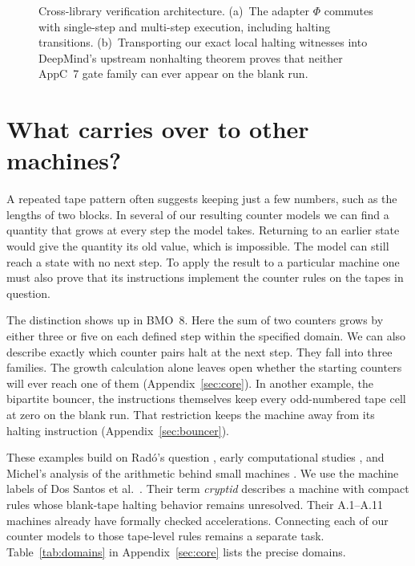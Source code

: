 \documentclass[11pt]{article}
\DeclareRobustCommand{\_}{\ifmmode\sb\else\textunderscore\allowbreak\fi}
\theoremstyle{definition}
\theoremstyle{remark}
\begin{document}
\begin{figure}[htbp]
\caption{Cross-library verification architecture. (a)~The adapter $\Phi$ commutes with single-step and multi-step execution, including halting transitions. (b)~Transporting our exact local halting witnesses into DeepMind's upstream nonhalting theorem proves that neither AppC~7 gate family can ever appear on the blank run.}
\label{fig:interop}
\end{figure}

\section{What carries over to other machines?}
\label{sec:carryover}
A repeated tape pattern often suggests keeping just a few numbers, such as the lengths of two blocks. In several of our resulting counter models we can find a quantity that grows at every step the model takes. Returning to an earlier state would give the quantity its old value, which is impossible. The model can still reach a state with no next step. To apply the result to a particular machine one must also prove that its instructions implement the counter rules on the tapes in question.

The distinction shows up in BMO~8. Here the sum of two counters grows by either three or five on each defined step within the specified domain. We can also describe exactly which counter pairs halt at the next step. They fall into three families. The growth calculation alone leaves open whether the starting counters will ever reach one of them (Appendix~\ref{sec:core}). In another example, the bipartite bouncer, the instructions themselves keep every odd-numbered tape cell at zero on the blank run. That restriction keeps the machine away from its halting instruction (Appendix~\ref{sec:bouncer}).

These examples build on Rad\'o's question \cite{rado1962noncomputable}, early computational studies \cite{lin1965computer,brady1983determination,marxen1990attacking}, and Michel's analysis of the arithmetic behind small machines \cite{michel2015busy}. We use the machine labels of Dos Santos et al.\ \cite{dossantos2026limits}. Their term \emph{cryptid} describes a machine with compact rules whose blank-tape halting behavior remains unresolved. Their A.1--A.11 machines already have formally checked accelerations. Connecting each of our counter models to those tape-level rules remains a separate task. Table~\ref{tab:domains} in Appendix~\ref{sec:core} lists the precise domains.
\end{document}
